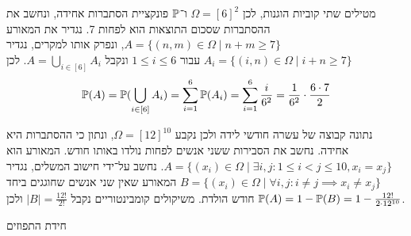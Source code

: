 \Subquestion{}
מטילים שתי קוביות הוגנות, לכן $\Omega = {[6]}^2$ ו־$\mathbb{P}$ פונקציית הסתברות אחידה, ונחשב את ההסתברות שסכום התוצאות הוא לפחות 7.
נגדיר את המאורע $A = \{ (n, m) \in \Omega \mid n + m \ge 7 \}$, ונפרק אותו למקרים, נגדיר $A_i = \{ (i, n) \in \Omega \mid i + n \ge 7 \}$ עבור $1 \le i \le 6$ ונקבל $A = \bigcup_{i \in [6]} A_i$.
לכן
\[
	\mathbb{P}(A) = \mathbb{P}(\bigcup_{i \in [6]} A_i)
	= \sum_{i = 1}^{6} \mathbb{P}(A_i)
	= \sum_{i = 1}^{6} \frac{i}{6^2}
	= \frac{1}{6^2} \cdot \frac{6 \cdot 7}{2}
\]

\Subquestion{}
נתונה קבוצה של עשרה חודשי לידה ולכן נקבע $\Omega = {[12]}^{10}$, ונתון כי ההסתברות היא אחידה.
נחשב את הסבירות ששני אנשים לפחות נולדו באותו חודש.
המאורע הוא $A = \{ (x_i) \in \Omega \mid \exists i, j : 1 \le i < j \le 10, x_i = x_j \}$.
נחשב על־ידי חישוב המשלים, נגדיר $B = \{ (x_i) \in \Omega \mid \forall i, j : i \ne j \implies x_i \ne x_j \}$ המאורע שאין שני אנשים שחוגגים ביחד חודש הולדת.
משיקולים קומבינטוריים נקבל $|B| = \frac{12!}{2!}$ ולכן $\mathbb{P}(A) = 1 - \mathbb{P}(B) = 1 - \frac{12!}{2 \cdot 12^{10}}$.

\Subquestion{}
חידת התפוזים


